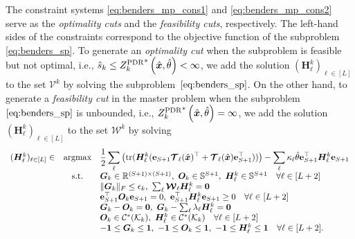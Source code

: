 \documentclass{article}
\newcommand{\st}{\textnormal{s.t.}}
\newcommand{\RR}{\mathbb{R}}
\newcommand{\tr}{\textup{tr}}
\begin{document}
The  constraint systems \eqref{eq:benders_mp_cons1} and \eqref{eq:benders_mp_cons2} serve as the \textit{optimality cuts} and the \textit{feasibility cuts}, respectively.  The left-hand sides of the constraints correspond to the objective function of the subproblem \eqref{eq:benders_sp}.  %
To generate an \textit{optimality cut}  when the subproblem is feasible but not optimal, i.e., $\hat{s}_k \leq {Z^{\textup{PDR}}_k}^* \left(\hat{\bm x}, \hat{\theta} \right) < \infty$, we add the solution $(\bm H_\ell^k)_{\ell \in [L]}$ to the set $\mathcal{V}^k$ by solving the subproblem~$\eqref{eq:benders_sp}$. %
On the other hand, to generate a \textit{feasibility cut} in the master problem when the subproblem $\eqref{eq:benders_sp}$ is unbounded, i.e., ${Z^{\textup{PDR}}_k}^* \left(\hat{\bm x}, \hat{\theta} \right) = \infty$, we add the solution $(\bm H_\ell^k)_{\ell \in [L]}$ to the set $\mathcal{W}^k$ by solving
\begin{equation}
\label{eq:benders_fea_cut}
\begin{array}{ccl}
(\bm H_\ell^k)_{\ell \in [L]} \in & \displaystyle \textup{argmax}  & \displaystyle \frac{1}{2}\sum_\ell \left( \tr(\bm H_\ell^k(\mathbf{e}_{S+1} \bm{\mathcal{T}}_\ell (\hat{\bm x})^\top + \bm{\mathcal{T}}_\ell (\hat{\bm x}) \mathbf{e}_{S+1}^\top)) \right) - \sum_\ell \kappa_\ell \hat{\theta} \mathbf{e}_{S+1}^\top \bm H_\ell^k \mathbf{e}_{S+1} \\
& \st & \bm G_k \in \RR^{(S+1) \times (S+1)}, \ \bm O_k \in \mathbb{S}^{S+1}, \ \bm H_\ell^k \in \mathbb{S}^{S+1} \quad \forall \ell \in [L+2] \\
& & \|\bm G_k\|_F \leq \epsilon_k, \ \sum_\ell \bm{\mathcal W}_\ell \bm H_\ell^k = \bm 0 \\
& & \mathbf{e}_{S+1}^\top \bm O_k \mathbf{e}_{S+1} = 0, \ \mathbf{e}_{S+1}^\top \bm H_\ell^k \mathbf{e}_{S+1} \geq 0 \quad \forall \ell \in [L+2] \\
& & \bm G_k - \bm O_k  = \bm 0, \ \bm G_k - \sum_\ell \lambda_\ell \bm H_\ell^k  = \bm 0\\
& & \bm O_k \in \mathcal{C^*}(\mathcal{K}_k), \ \bm H_\ell^k \in \mathcal{C^*}(\mathcal{K}_k) \quad \forall \ell \in [L+2] \\
& & -\mathbf{1} \leq \bm G_k \leq \mathbf{1},\ -\mathbf{1} \leq \bm O_k \leq \mathbf{1}, \ -\mathbf{1} \leq \bm H_\ell^k \leq \mathbf{1} \quad \forall \ell \in [L+2]. \\
\end{array}
\end{equation}
\end{document}
